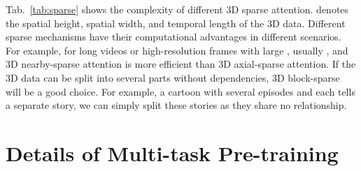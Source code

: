 \documentclass[10pt,twocolumn,letterpaper]{article}
\begin{document}
Tab.~\ref{tab:sparse} shows the complexity of different 3D sparse attention.  denotes the spatial height, spatial width, and temporal length of the 3D data. Different sparse mechanisms have their computational advantages in different scenarios. For example, for long videos or high-resolution frames with large , usually , and 3D nearby-sparse attention is more efficient than 3D axial-sparse attention. If the 3D data can be split into several parts without dependencies, 3D block-sparse will be a good choice. For example, a cartoon with several episodes and each tells a separate story, we can simply split these stories as they share no relationship.

\section{Details of Multi-task Pre-training}
\end{document}

